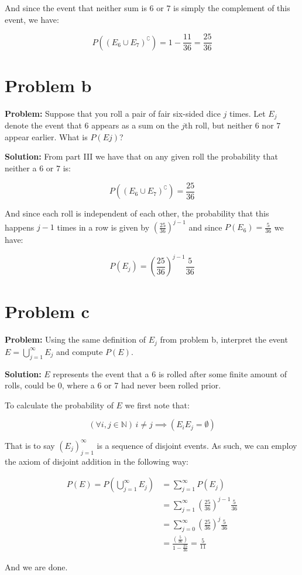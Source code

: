\documentclass{article}
\begin{document}
And since the event that neither sum is $6$ or $7$ is simply the complement of this event, we have:

\begin{equation*}
    P((E_6\cup E_7)^\complement)=1-\frac{11}{36}=\frac{25}{36}
\end{equation*}

\section*{Problem b}
\noindent\textbf{Problem:} Suppose that you roll a pair of fair six-sided dice $j$ times. Let $E_j$ denote the event that
$6$ appears as a sum on the $j$th roll, but neither $6$ nor $7$ appear earlier. What is $P(Ej)$?
\bigskip

\noindent\textbf{Solution:} From part III we have that on any given roll  the probability that neither a $6$ or $7$ is:

\begin{equation*}
    P((E_6\cup E_7)^\complement)=\frac{25}{36}
\end{equation*}

And since each roll is independent of each other, the probability that this happens $j-1$ times in a row is given by $\left(\frac{25}{36}\right)^{j-1}$ and since $P(E_6)=\frac{5}{36}$ we have:

\begin{equation*}
    P(E_j)=\left(\frac{25}{36}\right)^{j-1}\frac{5}{36}
\end{equation*}

\section*{Problem c}
\noindent\textbf{Problem:} Using the same definition of $E_j$ from problem b, interpret the event $E=\bigcup^\infty_{j=1}E_j$ and compute $P(E)$.
\bigskip

\noindent\textbf{Solution:} $E$ represents the event that a 6 is rolled after some finite amount of rolls, could be 0, where a 6 or 7 had never been rolled prior.

To calculate the probability of $E$ we first note that:

\begin{equation*}
    (\forall i,j\in\mathbb N)\, i\not=j\implies (E_iE_j=\emptyset)
\end{equation*}

That is to say $(E_j)_{j=1}^\infty$ is a sequence of disjoint events. As such, we can employ the axiom of disjoint addition in the following way:

\begin{align*}
    P(E)=P\left(\bigcup_{j=1}^\infty E_j\right)&=\sum_{j=1}^\infty P(E_j)\tag{axiom of disjoint addition}\\
    &=\sum_{j=1}^\infty \left(\frac{25}{36}\right)^{j-1}\frac{5}{36}\tag{def. of $P(E_j)$}\\
    &=\sum_{j=0}^\infty \left(\frac{25}{36}\right)^j\frac{5}{36}\tag{change of index}\\
    &=\frac{\left(\frac{5}{36}\right)}{1-\frac{25}{36}}=\frac{5}{11}\tag{geometric series}
\end{align*}

And we are done.
\end{document}
